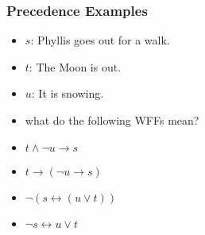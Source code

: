 \documentclass[dvipsnames]{beamer}
\begin{document}
\begin{frame}
  \frametitle{Precedence Examples}

  \begin{example}
    \begin{itemize}
      \item $s$: Phyllis goes out for a walk.
      \item $t$: The Moon is out.
      \item $u$: It is snowing.
      \item what do the following WFFs mean?

      \pause
      \medskip
      \item $t \wedge \neg u \rightarrow s$
      \pause
      \item $t \rightarrow (\neg u \rightarrow s)$
      \pause
      \item $\neg (s \leftrightarrow (u \vee t))$
      \pause
      \item $\neg s \leftrightarrow u \vee t$
    \end{itemize}
  \end{example}
\end{frame}
\end{document}
